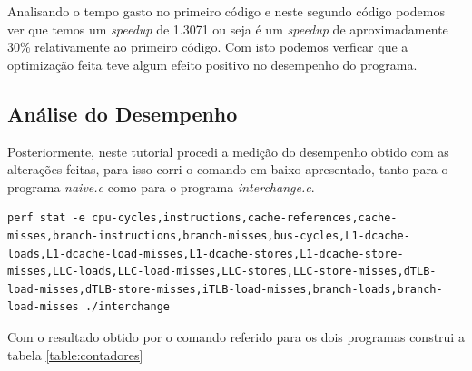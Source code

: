 \documentclass[conference,compsoc]{IEEEtran}
\begin{document}
Analisando o tempo gasto no primeiro código e neste segundo código podemos ver que temos um \textit{speedup} de 1.3071 ou seja é um \textit{speedup} de aproximadamente 30\% relativamente ao primeiro código. Com isto podemos verficar que a optimização feita teve algum efeito positivo no desempenho do programa.

\subsection{Análise do Desempenho}

Posteriormente, neste tutorial procedi a medição do desempenho obtido com as alterações feitas, para isso corri o comando em baixo apresentado, tanto para o programa \textit{naive.c} como para o programa \textit{interchange.c}.

\begin{lstlisting}
perf stat -e cpu-cycles,instructions,cache-references,cache-misses,branch-instructions,branch-misses,bus-cycles,L1-dcache-loads,L1-dcache-load-misses,L1-dcache-stores,L1-dcache-store-misses,LLC-loads,LLC-load-misses,LLC-stores,LLC-store-misses,dTLB-load-misses,dTLB-store-misses,iTLB-load-misses,branch-loads,branch-load-misses ./interchange
\end{lstlisting}
 
 Com o resultado obtido por o comando referido para os dois programas construi a tabela \ref{table:contadores}
 
\end{document}
